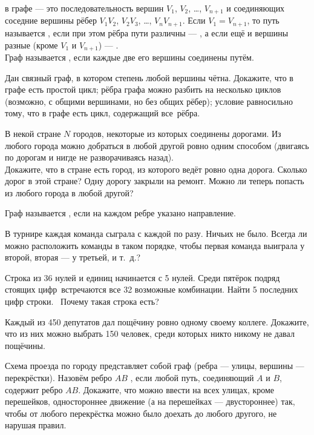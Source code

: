 \documentclass[a4paper,11pt]{article}
\begin{document}
 в графе --- это последовательность вершин
$V_1$, $V_2$, \dots, $V_{n+1}$ и соединяющих соседние вершины рёбер
$V_1 V_2$, $V_2V_3$, \dots, $V_n V_{n+1}$.
Если $V_1=V_{n+1}$, то путь называется ,
если при этом р\"ебра пути различны --- ,
а если ещ\"е и вершины разные (кроме $V_1$ и $V_{n+1}$) ---
.\\
Граф называется , если каждые две его вершины соединены пут\"ем.

Дан связный граф, в котором степень любой вершины чётна. Докажите, что
 в графе есть простой цикл;
 рёбра графа можно разбить на несколько циклов
(возможно, с общими вершинами, но без общих рёбер);
 условие равносильно тому, что в графе есть цикл, содержащий все~р\"ебра.

В некой стране $N$ городов, некоторые из которых соединены дорогами.
Из любого города можно добраться в любой другой
ровно одним способом (двигаясь по дорогам и нигде не разворачиваясь назад).
\\
 Докажите, что в стране есть город, из которого ведёт ровно
одна дорога.
Сколько дорог в этой стране?
Одну дорогу закрыли на ремонт. Можно ли теперь попасть из любого
города в любой другой?

Граф называется , если на каждом ребре указано
направление.

В турнире каждая команда сыграла с каждой по разу.
Ничьих не было. Всегда ли можно расположить команды в таком
порядке, чтобы первая команда выиграла у второй,
вторая --- у третьей, и т.~д.?

Строка из 36 нулей и единиц начинается с 5 нулей.
Среди пятёрок подряд стоящих цифр~встречаются все 32 возможные комбинации.
Найти 5 последних цифр строки.
 \hspace*{-3.2mm} {\bf *} \ Почему такая строка есть?

Каждый из 450 депутатов дал пощёчину ровно одному своему
коллеге. Докажите, что из них можно выбрать 150
человек,  среди которых никто никому не давал пощёчины.

Схема проезда по городу представляет собой граф (ребра --- улицы,
вершины --- перекрёстки). Назовём ребро $AB$ , если
любой путь, соединяющий $A$ и $B$, содержит ребро $AB$.
Докажите, что можно ввести на всех улицах, кроме перешейков, одностороннее
движение (а на перешейках --- двустороннее) так, чтобы от любого
перекрёстка можно было доехать до любого другого, не нарушая правил.




\end{document}

